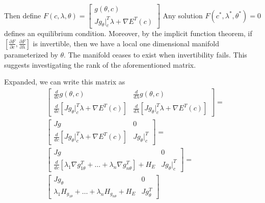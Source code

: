 \documentclass[12pt]{article}
\begin{document}
Then define $F(c, \lambda, \theta) = \begin{bmatrix}  g(\theta, c) \\ Jg_\theta|_c^T \lambda + \nabla E^T(c)\end{bmatrix}$
Any solution $F(c^*, \lambda^*, \theta^*) = 0$ defines an equilibrium condition. Moreover, by the implicit function theorem,
if $[\frac{\partial F}{\partial c}, \frac{\partial F}{\partial \lambda}]$ is invertible, then we have a local one dimensional
manifold parameterized by $\theta$. The manifold ceases to exist when invertibility fails. This suggests investigating the rank
of the aforementioned matrix.

Expanded, we can write this matrix as \[
  \begin{aligned}
    &\begin{bmatrix}  \frac{d}{dc} g(\theta, c) & \frac{d}{d\lambda} g(\theta, c) \\
       \frac{d}{dc} [Jg_\theta|_c^T \lambda + \nabla E^T(c)] & \frac{d}{d\lambda}[Jg_\theta|_c^T \lambda + \nabla E^T(c)]\end{bmatrix} = \\
    &\begin{bmatrix}
       Jg & 0 \\
       \frac{d}{dc} [Jg_\theta|_c^T \lambda + \nabla E^T(c)] & Jg_\theta|_c^T\end{bmatrix} = \\
    &\begin{bmatrix}
       Jg & 0 \\
       \frac{d}{dc} [\lambda_1 \nabla g^T_{1 \theta} + \ldots +  \lambda_n \nabla g^T_{n \theta}]  +  H_E & Jg_\theta|_c^T\end{bmatrix} = \\    
    &\begin{bmatrix}
       Jg_\theta & 0 \\
       \lambda_1  H_{g_{1 \theta}} + \ldots +  \lambda_n H_{ g_{n \theta}}  +  H_E & Jg_\theta^T\end{bmatrix}
  \end{aligned}
\]






                    
                      
\end{document}
